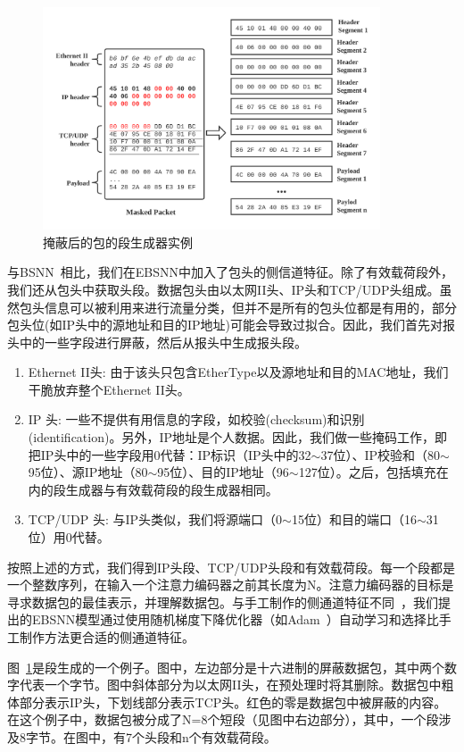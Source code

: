 \documentclass[degree=master,cjk-font=noto]{thuthesis}
\begin{document}
\begin{figure}[!tp]
	\centerline{\includegraphics[width=10cm]{BSNN_Segment.png}}
	\caption{掩蔽后的包的段生成器实例}
	\label{fig2}
\end{figure}

与BSNN~\cite{bsnn}相比，我们在EBSNN中加入了包头的侧信道特征。除了有效载荷段外，我们还从包头中获取头段。数据包头由以太网II头、IP头和TCP/UDP头组成。虽然包头信息可以被利用来进行流量分类，但并不是所有的包头位都是有用的，部分包头位(如IP头中的源地址和目的IP地址)可能会导致过拟合。因此，我们首先对报头中的一些字段进行屏蔽，然后从报头中生成报头段。

\begin{enumerate}
	\item Ethernet II头: 由于该头只包含EtherType以及源地址和目的MAC地址，我们干脆放弃整个Ethernet II头。
	\item IP 头: 一些不提供有用信息的字段，如校验(checksum)和识别(identification)。另外，IP地址是个人数据。因此，我们做一些掩码工作，即把IP头中的一些字段用0代替：IP标识（IP头中的32$\sim$37位）、IP校验和（80$\sim$95位）、源IP地址（80$\sim$95位）、目的IP地址（96$\sim$127位）。之后，包括填充在内的段生成器与有效载荷段的段生成器相同。
	\item TCP/UDP 头: 与IP头类似，我们将源端口（0$\sim$15位）和目的端口（16$\sim$31位）用0代替。
\end{enumerate}

按照上述的方式，我们得到IP头段、TCP/UDP头段和有效载荷段。每一个段都是一个整数序列，在输入一个注意力编码器之前其长度为N。注意力编码器的目标是寻求数据包的最佳表示，并理解数据包。与手工制作的侧通道特征不同~\cite{moore2005discriminators}，我们提出的EBSNN模型通过使用随机梯度下降优化器（如Adam~\cite{Adam}）自动学习和选择比手工制作方法更合适的侧通道特征。

图~\ref{fig2}是段生成的一个例子。图中，左边部分是十六进制的屏蔽数据包，其中两个数字代表一个字节。图中斜体部分为以太网II头，在预处理时将其删除。数据包中粗体部分表示IP头，下划线部分表示TCP头。红色的零是数据包中被屏蔽的内容。在这个例子中，数据包被分成了N=8个短段（见图中右边部分），其中，一个段涉及8字节。在图中，有7个头段和n个有效载荷段。
\end{document}
